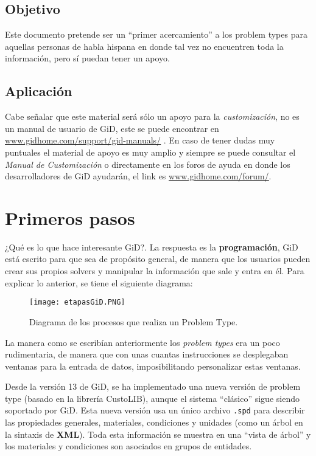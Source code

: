 \documentclass[10pt, a4paper, twocolumn]{article} %
\begin{document}
\subsection{Objetivo}

Este documento pretende ser un ``primer acercamiento'' a los problem types para aquellas personas de habla hispana en donde tal vez no encuentren toda la información, pero sí puedan tener un apoyo.

\subsection{Aplicación}

Cabe señalar que este material será sólo un apoyo para la \textit{customización}, no es un manual de usuario de GiD, este se puede encontrar en \textcolor{BlueGiD}{\underline{\url{www.gidhome.com/support/gid-manuals/}}} . En caso de tener dudas muy puntuales el material de apoyo es muy amplio y siempre se puede consultar el \textit{Manual de Customización} o directamente en los foros de ayuda en donde los desarrolladores de GiD ayudarán, el link es \textcolor{BlueGiD}{\underline{\url{www.gidhome.com/forum/}}}.

\section{Primeros pasos}
\label{sec:manualTCL}
¿Qué es lo que hace interesante GiD?. La respuesta es la \textbf{programación}, GiD está escrito para que sea de propósito general, de manera que los usuarios pueden crear sus propios solvers y manipular la información que sale y entra en él. Para explicar lo anterior, se tiene el siguiente diagrama:

\begin{figure}[hbt!]\centering
	\texttt{[image: etapasGiD.PNG]}
	\caption{Diagrama de los procesos que realiza un Problem Type.}
	\label{fig:diagramaProcesos}
\end{figure}

La manera como se escribían anteriormente los \textit{problem types} era un poco rudimentaria, de manera que con unas cuantas instrucciones se desplegaban ventanas para la entrada de datos, imposibilitando personalizar estas ventanas.

Desde la versión 13 de GiD, se ha implementado una nueva versión de problem type (basado en la librería CustoLIB), aunque el sistema ``clásico'' sigue siendo soportado por GiD. Esta nueva versión usa un único archivo \texttt{.spd} para describir las propiedades generales, materiales, condiciones y unidades (como un árbol en la sintaxis de \textbf{XML}). Toda esta información se muestra en una ``vista de árbol'' y los materiales y condiciones son asociados en grupos de entidades.
\end{document}
